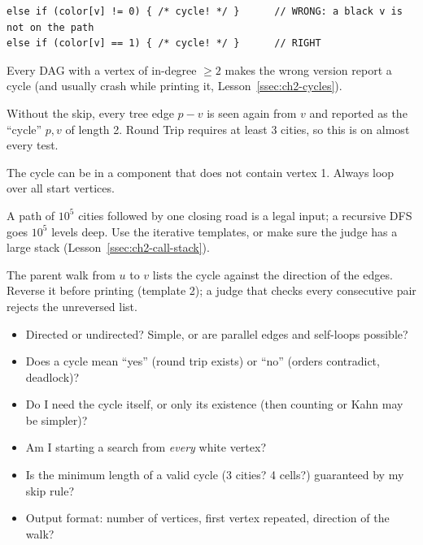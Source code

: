 \begin{warningbox}
\begin{lstlisting}[style=snippet]
else if (color[v] != 0) { /* cycle! */ }      // WRONG: a black v is not on the path
else if (color[v] == 1) { /* cycle! */ }      // RIGHT
\end{lstlisting}
Every DAG with a vertex of in-degree $\ge 2$ makes the wrong version report a cycle (and usually crash while printing it, Lesson~\ref{ssec:ch2-cycles}).
\end{warningbox}

\begin{warningbox}
Without the skip, every tree edge $p - v$ is seen again from $v$ and reported as the ``cycle'' $p, v$ of length 2. Round Trip requires at least 3 cities, so this is \wa{} on almost every test.
\end{warningbox}

\begin{warningbox}
The cycle can be in a component that does not contain vertex 1. Always loop over all start vertices.
\end{warningbox}

\begin{warningbox}
A path of $10^5$ cities followed by one closing road is a legal input; a recursive DFS goes $10^5$ levels deep. Use the iterative templates, or make sure the judge has a large stack (Lesson~\ref{ssec:ch2-call-stack}).
\end{warningbox}

\begin{warningbox}
The parent walk from $u$ to $v$ lists the cycle against the direction of the edges. Reverse it before printing (template 2); a judge that checks every consecutive pair rejects the unreversed list.
\end{warningbox}

\begin{checklistbox}
\begin{itemize}[leftmargin=*]
    \item[$\square$] Directed or undirected? Simple, or are parallel edges and self-loops possible?
    \item[$\square$] Does a cycle mean ``yes'' (round trip exists) or ``no'' (orders contradict, deadlock)?
    \item[$\square$] Do I need the cycle itself, or only its existence (then counting or Kahn may be simpler)?
    \item[$\square$] Am I starting a search from \emph{every} white vertex?
    \item[$\square$] Is the minimum length of a valid cycle (3 cities? 4 cells?) guaranteed by my skip rule?
    \item[$\square$] Output format: number of vertices, first vertex repeated, direction of the walk?
\end{itemize}
\end{checklistbox}
